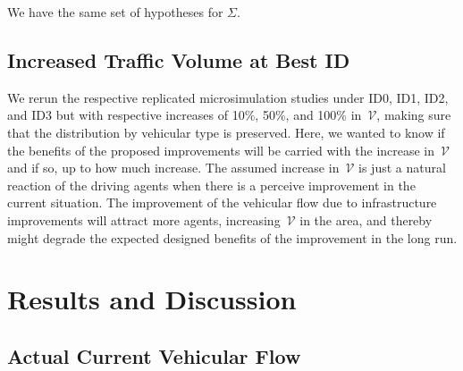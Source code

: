 \documentclass[preprint]{./acm_proc_article-sp}
\begin{document}
We have the same set of hypotheses for $\Sigma$.

\subsection{Increased Traffic Volume at Best ID}

We rerun the respective replicated microsimulation studies under ID0, ID1, ID2, and ID3 but with respective increases of 10\%, 50\%, and 100\% in~$\mathcal{V}$, making sure that the distribution by vehicular type is preserved. Here, we wanted to know if the benefits of the proposed improvements will be carried with the increase in~$\mathcal{V}$ and if so, up to how much increase. The assumed increase in~$\mathcal{V}$  is just a natural reaction of the driving agents when there is a perceive improvement in the current situation. The improvement of the vehicular flow due to infrastructure improvements will attract more agents, increasing~$\mathcal{V}$ in the area, and thereby might degrade the expected designed benefits of the improvement in the long run.

\section{Results and Discussion}\label{sec:results}

\subsection{Actual Current Vehicular Flow}
\end{document}
